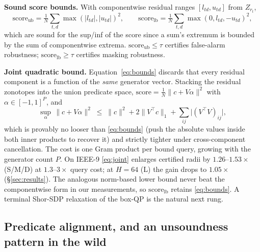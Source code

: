 \documentclass{article} %
\newcommand{\score}{\mathrm{score}}
\newcommand{\ub}{\mathrm{ub}}
\newcommand{\lb}{\mathrm{lb}}
\begin{document}
\textbf{Sound score bounds.} With componentwise residual ranges
$[l_{td}, u_{td}]$ from $Z_{r_t}$,
\begin{equation}
\label{eq:bounds}
\score_{\ub} = \tfrac{1}{N}\textstyle\sum_{t,d} \max(|l_{td}|,|u_{td}|)^2,
\qquad
\score_{\lb} = \tfrac{1}{N}\textstyle\sum_{t,d} \max(0, l_{td}, -u_{td})^2,
\end{equation}
which are sound for the sup/inf of the score since a sum's extremum is
bounded by the sum of componentwise extrema. $\score_{\ub} \le \tau$
certifies false-alarm robustness; $\score_{\lb} \ge \tau$ certifies
masking robustness.

\textbf{Joint quadratic bound.} Equation~\eqref{eq:bounds} discards
that every residual component is a function of the \emph{same}
generator vector. Stacking the residual zonotopes into the union
predicate space, $\score = \tfrac{1}{N}\lVert c + V\alpha\rVert^2$
with $\alpha \in [-1,1]^P$, and
\begin{equation}
\label{eq:joint}
\sup_\alpha\, \lVert c + V\alpha\rVert^2 \;\le\; \lVert c\rVert^2
  + 2\lVert V^\top c\rVert_1 + \textstyle\sum_{ij}\bigl|(V^\top V)_{ij}\bigr|,
\end{equation}
which is provably no looser than \eqref{eq:bounds} (push the absolute
values inside both inner products to recover it) and strictly tighter
under cross-component cancellation. The cost is one Gram product per
bound query, growing with the generator count $P$. On IEEE-9
\eqref{eq:joint} enlarges certified radii by $1.26$--$1.53\times$
(S/M/D) at $1.3$--$3\times$ query cost; at $H{=}64$ (L) the gain drops
to $1.05\times$ (\S\ref{sec:results}). The analogous norm-based lower
bound never beat the componentwise form in our measurements, so
$\score_{\lb}$ retains \eqref{eq:bounds}. A terminal Shor-SDP
relaxation of the box-QP is the natural next rung.

\subsection{Predicate alignment, and an unsoundness pattern in the wild}
\label{sec:aliasing}
\end{document}
